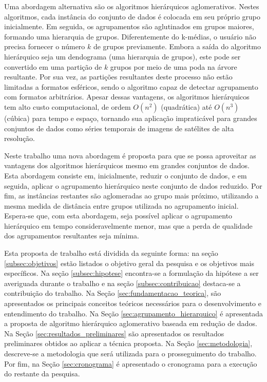 Uma abordagem alternativa são os algoritmos hierárquicos aglomerativos. Nestes
algoritmos, cada instância do conjunto de dados é colocada em seu próprio grupo
inicialmente. Em seguida, os agrupamentos são aglutinados em grupos maiores, 
formando uma hierarquia de grupos. Diferentemente do k-médias, o usuário
não precisa fornecer o número $k$ de grupos previamente. Embora a saída do 
algoritmo hierárquico seja um dendograma (uma hierarquia de grupos), este pode
ser convertido em uma partição de $k$ grupos por meio de uma poda na árvore
resultante. Por sua vez, as partições resultantes deste processo não estão
limitadas a formatos esféricos, sendo o algoritmo capaz de detectar agrupamento
com formatos arbitrários. Apesar dessas vantagens, os algoritmos hierárquicos
tem alto custo computacional, de ordem $O(n^2)$ (quadrática) até $O(n^3)$
(cúbica) para tempo e espaço, tornando sua aplicação impraticável para grandes
conjuntos de dados como séries temporais de imagens de satélites de alta
resolução.

Neste trabalho uma nova abordagem é proposta para que se possa aproveitar
as vantagens dos algoritmos hierárquicos mesmo em grandes conjuntos de dados.
Esta abordagem consiste em, inicialmente, reduzir o conjunto de dados, e em
seguida, aplicar o agrupamento hierárquico neste conjunto de dados reduzido. Por
fim, as instâncias restantes são aglomeradas ao grupo mais próximo, utilizando a
mesma medida de distância entre grupos utilizada no agrupamento inicial.
Espera-se que, com esta abordagem, seja possível aplicar o agrupamento
hierárquico em tempo consideravelmente menor, mas que a perda de qualidade dos
agrupamentos resultantes seja mínima.

Esta proposta de trabalho está dividida da seguinte forma: na seção
\ref{subsec:objetivos} estão listados o objetivo geral da pesquisa e os
objetivos mais específicos. Na seção \ref{subsec:hipotese} encontra-se a 
formulação da hipótese a ser averiguada durante o trabalho e na seção
\ref{subsec:contribuicao} destaca-se a contribuição do trabalho. Na Seção
\ref{sec:fundamentacao_teorica}, são apresentados os principais conceitos
teóricos necessários para o desenvolvimento e entendimento do trabalho. Na Seção
\ref{sec:agrupamento_hierarquico} é apresentada a proposta de algoritmo
hierárquico aglomerativo baseada em redução de dados. Na Seção
\ref{sec:resultados_preliminares} são apresentados os resultados preliminares
obtidos ao aplicar a técnica proposta. Na Seção \ref{sec:metodologia},
descreve-se a metodologia que será utilizada para o prosseguimento do trabalho.
Por fim, na Seção \ref{sec:cronograma} é apresentado o cronograma para a
execução do restante da pesquisa.

